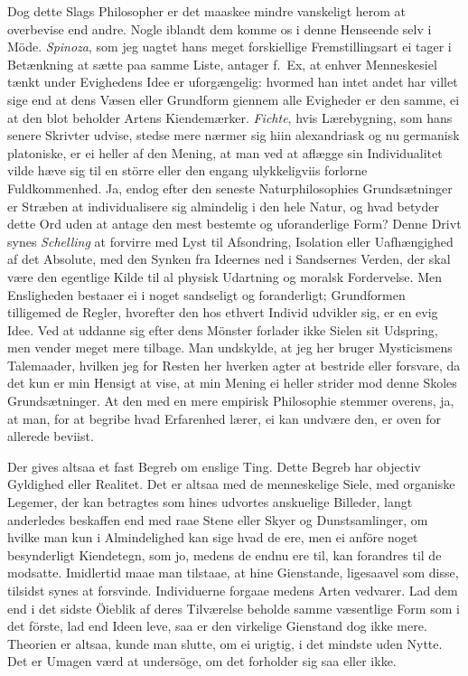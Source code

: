 \documentclass[12pt,a4paper]{article}
\newcommand{\opage}[1]{\marginnote{\footnotesize\textit{[#1]}}}
\begin{document}
Dog dette Slags Philosopher er det maaskee mindre vanskeligt herom at
overbevise end andre. Nogle iblandt dem komme os i denne Henseende selv i
Möde. \emph{Spinoza}, som jeg uagtet hans meget forskiellige
Fremstillingsart ei tager i Betænkning at sætte paa samme Liste, antager
f.~Ex, at enhver Menneskesiel
\opage{246} tænkt under Evighedens Idee er uforgængelig: hvormed han intet andet har
villet sige end at dens Væsen eller Grundform giennem alle Evigheder er den
samme, ei at den blot beholder Artens Kiendemærker. \emph{Fichte}, hvis
Lærebygning, som hans senere Skrivter udvise, stedse mere nærmer sig hiin
alexandriask og nu germanisk platoniske, er ei heller af den Mening, at man
ved at aflægge sin Individualitet vilde hæve sig til en större eller den
engang ulykkeligviis forlorne Fuldkommenhed. Ja, endog efter den seneste
Naturphilosophies Grundsætninger er Stræben at individualisere sig
almindelig i den hele Natur, og hvad betyder dette Ord uden at antage den
mest bestemte og uforanderlige Form? Denne Drivt synes \emph{Schelling} at
forvirre med Lyst til Afsondring, Isolation eller Uafhængighed af det
Absolute, med den Synken fra Ideernes ned i Sandsernes Verden, der skal
være den egentlige Kilde til al physisk Udartning og moralsk Fordervelse.
Men Ensligheden bestaaer ei i noget sandseligt og foranderligt; Grundformen
tilligemed de Regler, hvorefter den hos ethvert Individ udvikler sig, er en
evig Idee. Ved at uddanne sig efter dens Mönster forlader ikke Sielen sit
Udspring, men vender meget mere tilbage. Man undskylde, at jeg her bruger
Mysticismens Talemaader, hvilken jeg for Resten her hverken agter at
bestride eller forsvare, da det kun er min Hensigt at vise, at min Mening ei
heller strider mod denne Skoles Grundsætninger. At den med en mere empirisk
Philosophie stemmer overens, ja, at man, for at begribe hvad Erfarenhed
lærer, ei kan undvære den, er oven for allerede beviist.

\opage{247} Der gives altsaa et fast Begreb om enslige Ting. Dette Begreb har objectiv
Gyldighed eller Realitet. Det er altsaa med de menneskelige Siele, med
organiske Legemer, der kan betragtes som hines udvortes anskuelige Billeder,
langt anderledes beskaffen end med raae Stene eller Skyer og
Dunstsamlinger, om hvilke man kun i Almindelighed kan sige hvad de ere, men
ei anföre noget besynderligt Kiendetegn, som jo, medens de endnu ere til,
kan forandres til de modsatte. Imidlertid maae man tilstaae, at hine
Gienstande, ligesaavel som disse, tilsidst synes at forsvinde. Individuerne
forgaae medens Arten vedvarer. Lad dem end i det sidste Öieblik af deres
Tilværelse beholde samme væsentlige Form som i det förste, lad end Ideen
leve, saa er den virkelige Gienstand dog ikke mere. Theorien er altsaa,
kunde man slutte, om ei urigtig, i det mindste uden Nytte. Det er Umagen
værd at undersöge, om det forholder sig saa eller ikke.
\end{document}
